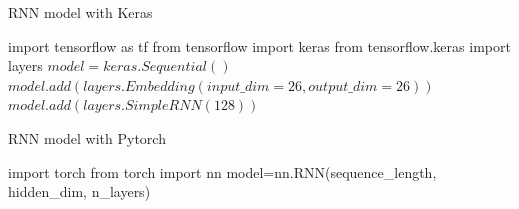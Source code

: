 \documentclass[10pt]{article}
\begin{document}
\begin{algorithm}
\caption{RNN model with Keras}\label{euclid}
\begin{algorithmic}[1]
\State import tensorflow as tf
\State from tensorflow import keras
\State from tensorflow.keras import layers
\State $model = keras.Sequential()$
\State $model.add(layers.Embedding(input\_dim=26, output\_dim=26))$
\State $model.add(layers.SimpleRNN(128))$
\EndProcedure
\end{algorithmic}
\end{algorithm}

\begin{algorithm}
\caption{RNN model with Pytorch}\label{euclid}
\begin{algorithmic}[1]
\State import torch
\State from torch import nn
\State model=nn.RNN(sequence\_length, hidden\_dim, n\_layers)
\EndProcedure
\end{algorithmic}
\end{algorithm}
\end{document}
